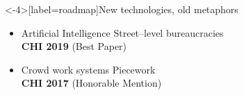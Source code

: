 \documentclass[presentation]{subfiles}
\begin{document}








\begin{frame}<-4>[label=roadmap]{New technologies, old metaphors}

    \begin{itemize}
      \item<+,3-5>[] \alert<4>{Artificial Intelligence \hfill Street--level bureaucracies
            \\\hfill{\footnotesize \textsc{\textbf{CHI 2019}}} {\scriptsize(Best Paper)}}
      
      \vspace{1em}

      \item<+,3,5-6>[] \alert<6>{Crowd work systems \hfill Piecework
            \\\hfill{\footnotesize \textsc{\textbf{CHI 2017}}} {\scriptsize(Honorable Mention)}}
    \end{itemize}

\end{frame}
\end{document}
